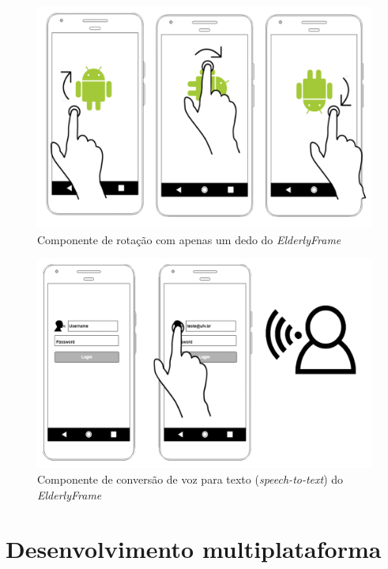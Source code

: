 \documentclass[
	12pt,				    %
	openright,			    %
	oneside,			    %
	a4paper,			    %
    sumario=tradicional,    %
	english,			    %
	brazil,				    %
	]{abntex2}              %
\begin{document}
\begin{figure}[H]
	\begin{center}
		\includegraphics[height=0.5\linewidth]{images/rotation.png}
	\end{center}
	\caption[Componente \textit{SimpleRotation} do \textit{ElderlyFrame}]{Componente de rotação com apenas um dedo do \textit{ElderlyFrame}}
	\label{fig:rotation}
\end{figure}

\begin{figure}[H]
	\begin{center}
		\includegraphics[height=0.5\linewidth]{images/speech-to-text.png}
	\end{center}
	\caption[Componente \textit{SpeechToText} do \textit{ElderlyFrame}]{Componente de conversão de voz para texto (\textit{speech-to-text}) do \textit{ElderlyFrame}}
	\label{fig:speechToText}
\end{figure}

\section{Desenvolvimento multiplataforma}
\end{document}
